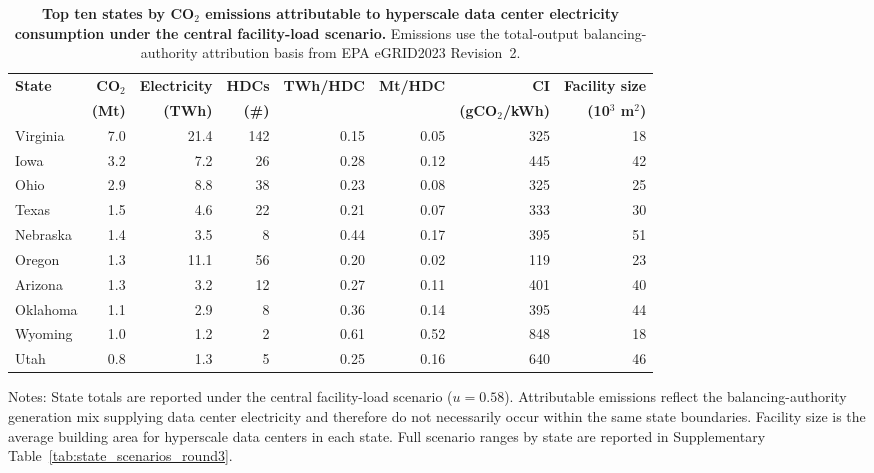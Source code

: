 \documentclass[12pt]{article}
\begin{document}
\begin{table}[htbp]
\centering
\small
\setlength{\tabcolsep}{5.0pt}
\renewcommand{\arraystretch}{1.18}
\begin{threeparttable}
\caption{\textbf{Top ten states by CO$_2$ emissions attributable to hyperscale data center electricity consumption under the central facility-load scenario.} Emissions use the total-output balancing-authority attribution basis from EPA eGRID2023 Revision~2.}
\label{tab:state_top_central}
\begin{tabular}{lrrrrrrr}
\toprule
\textbf{State} & \textbf{CO$_2$} & \textbf{Electricity} & \textbf{HDCs} & \textbf{TWh/HDC} & \textbf{Mt/HDC} & \textbf{CI} & \textbf{Facility size} \\
 & \textbf{(Mt)} & \textbf{(TWh)} & \textbf{(\#)} & & & \textbf{(gCO$_2$/kWh)} & \textbf{(10$^3$ m$^2$)} \\
\midrule
Virginia & 7.0 & 21.4 & 142 & 0.15 & 0.05 & 325 & 18 \\
Iowa & 3.2 & 7.2 & 26 & 0.28 & 0.12 & 445 & 42 \\
Ohio & 2.9 & 8.8 & 38 & 0.23 & 0.08 & 325 & 25 \\
Texas & 1.5 & 4.6 & 22 & 0.21 & 0.07 & 333 & 30 \\
Nebraska & 1.4 & 3.5 & 8 & 0.44 & 0.17 & 395 & 51 \\
Oregon & 1.3 & 11.1 & 56 & 0.20 & 0.02 & 119 & 23 \\
Arizona & 1.3 & 3.2 & 12 & 0.27 & 0.11 & 401 & 40 \\
Oklahoma & 1.1 & 2.9 & 8 & 0.36 & 0.14 & 395 & 44 \\
Wyoming & 1.0 & 1.2 & 2 & 0.61 & 0.52 & 848 & 18 \\
Utah & 0.8 & 1.3 & 5 & 0.25 & 0.16 & 640 & 46 \\
\bottomrule
\end{tabular}
\begin{tablenotes}[flushleft]
\footnotesize
\item Notes: State totals are reported under the central facility-load scenario ($u=0.58$). Attributable emissions reflect the balancing-authority generation mix supplying data center electricity and therefore do not necessarily occur within the same state boundaries. Facility size is the average building area for hyperscale data centers in each state. Full scenario ranges by state are reported in Supplementary Table~\ref{tab:state_scenarios_round3}.
\end{tablenotes}
\end{threeparttable}
\end{table}
\end{document}
